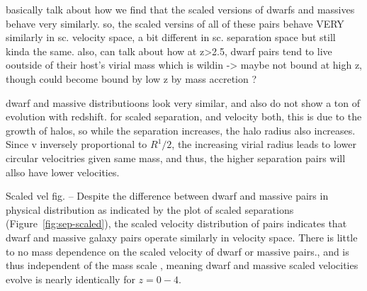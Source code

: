 \documentclass[twocolumn]{aastex631}
\begin{document}
    basically talk about how we find that the scaled versions of dwarfs and massives behave very similarly.
    so, the scaled versins of all of these pairs behave VERY similarly in sc. velocity space, a bit different in sc. separation space but still kinda the same. also, can talk about how at z>2.5, dwarf pairs tend to live ooutside of their host's virial mass which is wildin -> maybe not bound at high z, though could become bound by low z by mass accretion ? 
    
    dwarf and massive distributioons look very similar, and also do not show a ton of evolution with redshift. for scaled separation, and velocity both, this is due to the growth of halos, so while the separation increases, the halo radius also increases. Since v inversely proportional to $R^1/2$, the increasing virial radius leads to lower circular velocitries given same mass, and thus, the higher separation pairs will allso have lower velocities. 
    
    Scaled vel fig. --   Despite the difference between dwarf and massive pairs in physical distribution as indicated by the plot of scaled separations (Figure~\ref{fig:sep-scaled}), the scaled velocity distribution of pairs indicates that dwarf and massive galaxy pairs operate similarly in velocity space. There is little to no mass dependence on the scaled velocity of dwarf or massive pairs., and is thus independent of the mass scale , meaning dwarf and massive scaled velocities evolve is nearly identically for $z=0-4$.
\end{document}
